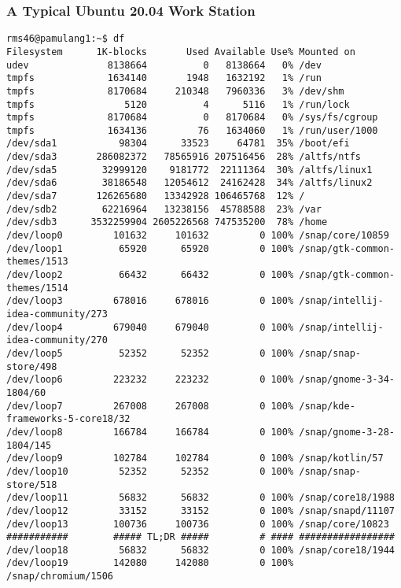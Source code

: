 \documentclass[xcolor=table, notheorems, hyperref={pdfpagelabels=false}]{beamer}
\begin{document}
\begin{frame}[fragile]
\frametitle{A Typical Ubuntu 20.04 Work Station}
\begin{lstlisting}[basicstyle=\ttfamily\tiny]
rms46@pamulang1:~$ df
Filesystem      1K-blocks       Used Available Use% Mounted on
udev              8138664          0   8138664   0% /dev
tmpfs             1634140       1948   1632192   1% /run
tmpfs             8170684     210348   7960336   3% /dev/shm
tmpfs                5120          4      5116   1% /run/lock
tmpfs             8170684          0   8170684   0% /sys/fs/cgroup
tmpfs             1634136         76   1634060   1% /run/user/1000
/dev/sda1           98304      33523     64781  35% /boot/efi
/dev/sda3       286082372   78565916 207516456  28% /altfs/ntfs
/dev/sda5        32999120    9181772  22111364  30% /altfs/linux1
/dev/sda6        38186548   12054612  24162428  34% /altfs/linux2
/dev/sda7       126265680   13342928 106465768  12% /
/dev/sdb2        62216964   13238156  45788588  23% /var
/dev/sdb3      3532259904 2605226568 747535200  78% /home
/dev/loop0         101632     101632         0 100% /snap/core/10859
/dev/loop1          65920      65920         0 100% /snap/gtk-common-themes/1513
/dev/loop2          66432      66432         0 100% /snap/gtk-common-themes/1514
/dev/loop3         678016     678016         0 100% /snap/intellij-idea-community/273
/dev/loop4         679040     679040         0 100% /snap/intellij-idea-community/270
/dev/loop5          52352      52352         0 100% /snap/snap-store/498
/dev/loop6         223232     223232         0 100% /snap/gnome-3-34-1804/60
/dev/loop7         267008     267008         0 100% /snap/kde-frameworks-5-core18/32
/dev/loop8         166784     166784         0 100% /snap/gnome-3-28-1804/145
/dev/loop9         102784     102784         0 100% /snap/kotlin/57
/dev/loop10         52352      52352         0 100% /snap/snap-store/518
/dev/loop11         56832      56832         0 100% /snap/core18/1988
/dev/loop12         33152      33152         0 100% /snap/snapd/11107
/dev/loop13        100736     100736         0 100% /snap/core/10823
###########        ##### TL;DR #####         # #### #################
/dev/loop18         56832      56832         0 100% /snap/core18/1944
/dev/loop19        142080     142080         0 100% /snap/chromium/1506
\end{lstlisting}
\end{frame}

\end{document}
